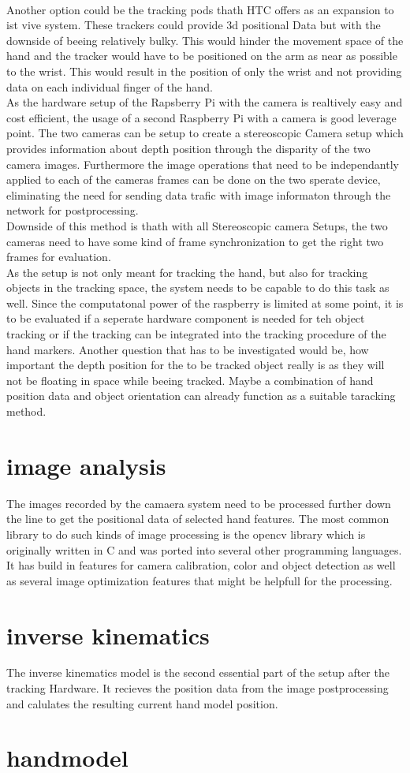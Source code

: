 \\Another option could be the tracking  pods thath HTC offers as an expansion to ist vive system. These trackers could provide 3d positional Data but with the downside of beeing relatively bulky. This would hinder the movement space of the hand and the tracker would have to be positioned on the arm as near as possible to the wrist. This would result in the position of only the wrist and not providing data on each individual finger of the hand.\\
As the hardware setup of the Rapsberry Pi with the camera is realtively easy and cost efficient, the usage of a second Raspberry Pi with a camera is good leverage point. The two cameras can be setup to create a stereoscopic Camera setup which provides information about depth position through the disparity of the two camera images. 
Furthermore  the image operations that need to be independantly applied to each of the cameras frames can be done on the two sperate device, eliminating the need for sending data trafic with image informaton through the network for postprocessing.
\\Downside of this method is thath with all Stereoscopic camera Setups, the two cameras need to have some kind of frame synchronization to get the right two frames for evaluation.
\\As the setup is not only meant for tracking the hand, but also for tracking objects in the tracking space, the system needs to be capable to do this task as well. Since the computatonal power of the raspberry is limited at some point, it is to be evaluated if a seperate hardware component is needed for teh object tracking or if the tracking can be integrated into the tracking procedure of the hand markers. Another question that has to be investigated would be, how important the depth position for the to be tracked object really is as they will not be floating in space while beeing tracked. Maybe a combination of hand position data and object orientation can already function as a suitable taracking method.







\section{image analysis}
The images recorded by the camaera system need to be processed further down the line to get the positional data of selected hand features. The most common library to do such kinds of image processing is the opencv library which is originally written in C and was ported into several other programming languages. It has build in features for camera calibration, color and object detection as well as several image optimization features that might be helpfull for the processing.
\section{inverse kinematics}
The inverse kinematics model is the second essential part of the setup after the tracking Hardware. It recieves the position data from the image postprocessing and calulates the resulting current hand model position.
\cite{Lansley.2016}
\section{handmodel}
 